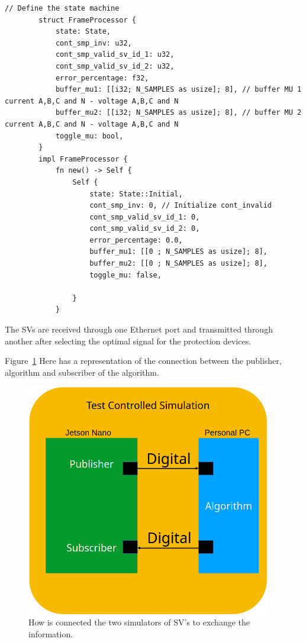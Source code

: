 	\begin{lstlisting}[caption={State Machine struct. }]
		// Define the state machine
		struct FrameProcessor {
			state: State,
			cont_smp_inv: u32,
			cont_smp_valid_sv_id_1: u32,
			cont_smp_valid_sv_id_2: u32,
			error_percentage: f32,
			buffer_mu1: [[i32; N_SAMPLES as usize]; 8], // buffer MU 1 current A,B,C and N - voltage A,B,C and N
			buffer_mu2: [[i32; N_SAMPLES as usize]; 8], // buffer MU 2 current A,B,C and N - voltage A,B,C and N
			toggle_mu: bool,
		}
		impl FrameProcessor {
			fn new() -> Self {
				Self {
					state: State::Initial,
					cont_smp_inv: 0, // Initialize cont_invalid
					cont_smp_valid_sv_id_1: 0,
					cont_smp_valid_sv_id_2: 0,
					error_percentage: 0.0,
					buffer_mu1: [[0 ; N_SAMPLES as usize]; 8],
					buffer_mu2: [[0 ; N_SAMPLES as usize]; 8],
					toggle_mu: false,
					
				}
			}
		\end{lstlisting}
		
		The SVs are received through one Ethernet port and transmitted through another after selecting the optimal signal for the protection devices.
		
		Figure~\ref{fig:test_setup} Here has a representation of the connection between the publisher, algorithm and subscriber of the algorithm.
		
		\begin{figure}[tbh]
			\centering
			\includegraphics[width=0.95\textwidth, keepaspectratio]{ch5/assets/test_setup.png}
			\caption{How is connected the two simulators of SV's to exchange the information.}
			\label{fig:test_setup}
		\end{figure}
		\FloatBarrier